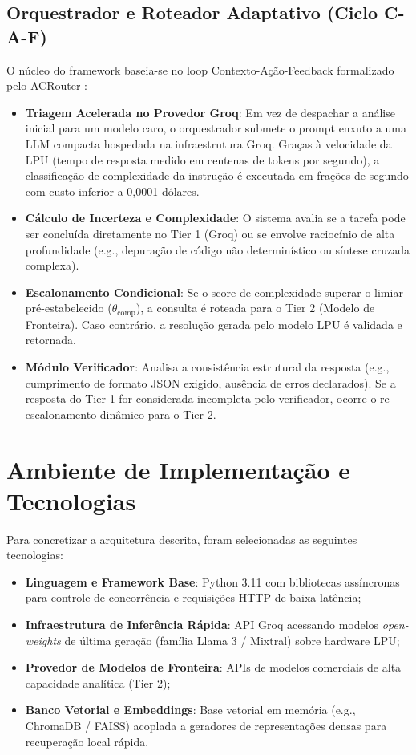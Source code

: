 \subsection{Orquestrador e Roteador Adaptativo (Ciclo C-A-F)}
O núcleo do framework baseia-se no loop Contexto-Ação-Feedback formalizado pelo ACRouter \cite{lance2026agentasrouter}:
\begin{itemize}
    \item \textbf{Triagem Acelerada no Provedor Groq}: Em vez de despachar a análise inicial para um modelo caro, o orquestrador submete o prompt enxuto a uma LLM compacta hospedada na infraestrutura Groq. Graças à velocidade da LPU (tempo de resposta medido em centenas de tokens por segundo), a classificação de complexidade da instrução é executada em frações de segundo com custo inferior a 0,0001 dólares.
    \item \textbf{Cálculo de Incerteza e Complexidade}: O sistema avalia se a tarefa pode ser concluída diretamente no Tier 1 (Groq) ou se envolve raciocínio de alta profundidade (e.g., depuração de código não determinístico ou síntese cruzada complexa).
    \item \textbf{Escalonamento Condicional}: Se o score de complexidade superar o limiar pré-estabelecido ($\theta_{\text{comp}}$), a consulta é roteada para o Tier 2 (Modelo de Fronteira). Caso contrário, a resolução gerada pelo modelo LPU é validada e retornada.
    \item \textbf{Módulo Verificador}: Analisa a consistência estrutural da resposta (e.g., cumprimento de formato JSON exigido, ausência de erros declarados). Se a resposta do Tier 1 for considerada incompleta pelo verificador, ocorre o re-escalonamento dinâmico para o Tier 2.
\end{itemize}

\section{Ambiente de Implementação e Tecnologias}

Para concretizar a arquitetura descrita, foram selecionadas as seguintes tecnologias:

\begin{itemize}
    \item \textbf{Linguagem e Framework Base}: Python 3.11 com bibliotecas assíncronas para controle de concorrência e requisições HTTP de baixa latência;
    \item \textbf{Infraestrutura de Inferência Rápida}: API Groq acessando modelos \textit{open-weights} de última geração (família Llama 3 / Mixtral) sobre hardware LPU;
    \item \textbf{Provedor de Modelos de Fronteira}: APIs de modelos comerciais de alta capacidade analítica (Tier 2);
    \item \textbf{Banco Vetorial e Embeddings}: Base vetorial em memória (e.g., ChromaDB / FAISS) acoplada a geradores de representações densas para recuperação local rápida.
\end{itemize}

